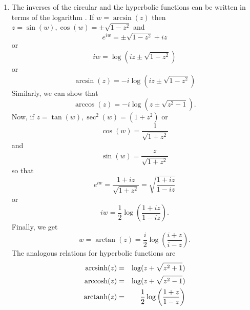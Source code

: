 \begin{enumerate}
\item The inverses of the circular and the hyperbolic functions can be written 
in terms of the logarithm \cite{aw}. If $w = \arcsin(z)$ then $z = \sin(w),
\cos(w) = \pm\sqrt{1 - z^2}$ and
\[
e^{iw} = \pm\sqrt{1 - z^2} + iz
\]
or
\[
iw = \log(iz \pm\sqrt{1 - z^2})
\]
or
\begin{equation}\label{c1s3e31}
\arcsin(z) = -i\log(iz \pm\sqrt{1 - z^2})
\end{equation}
Similarly, we can show that
\begin{equation}\label{c1s3e32}
\arccos(z) = -i\log(z \pm \sqrt{z^2 - 1}).
\end{equation}
Now, if $z = \tan(w), \sec^2(w) = (1 + z^2)$ or
\[
\cos(w) = \frac{1}{\sqrt{1 + z^2}}
\]
and
\[
\sin(w) = \frac{z}{\sqrt{1 + z^2}}
\]
so that
\[
e^{iw} = \frac{1 + iz}{\sqrt{1 + z^2}} = \sqrt{\frac{1 + iz}{1 - iz}}
\]
or
\[
iw = \frac{1}{2}\log\left(\frac{1 + iz}{1 - iz}\right).
\]
Finally, we get
\begin{equation}\label{c1s3e33}
w = \arctan(z) = \frac{i}{2}\log\left(\frac{i + z}{i - z}\right).
\end{equation}
The analogous relations for hyperbolic functions are
\begin{eqnarray}
\operatorname{arcsinh}(z) &=& \log(z + \sqrt{z^2 + 1}) \label{c1s3e34} \\
\operatorname{arccosh}(z) &=& \log(z + \sqrt{z^2 - 1}) \label{c1s3e35} \\
\operatorname{arctanh}(z) &=& \frac{1}{2}\log\left(\frac{1+z}{1-z}\right) \label{c1s3e36} 
\end{eqnarray}

\end{enumerate}
